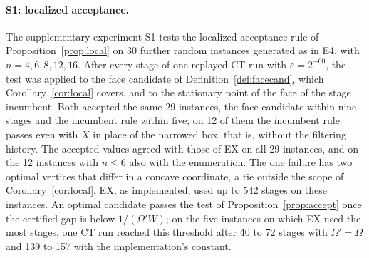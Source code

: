 \paragraph{S1: localized acceptance.}\label{sec:comp-localized}
The supplementary experiment S1 tests the localized acceptance rule of
Proposition~\ref{prop:local} on 30 further random instances generated as in
E4, with $n=4,6,8,12,16$. After every stage of one replayed CT run with
$\varepsilon=2^{-60}$, the test was applied to the face candidate of
Definition~\ref{def:facecand}, which Corollary~\ref{cor:local} covers, and to
the stationary point of the face of the stage incumbent. Both accepted the
same 29 instances, the face candidate within nine stages and the incumbent
rule within five; on 12 of them the incumbent rule passes even with $X$ in
place of the narrowed box, that is, without the filtering history. The
accepted values agreed with those of EX on all 29 instances, and on the 12
instances with $n\le6$ also with the enumeration. The one failure has two
optimal vertices that differ in a concave coordinate, a tie outside the scope
of Corollary~\ref{cor:local}. EX, as implemented, used up to 542 stages on
these instances. An optimal candidate passes the test of
Proposition~\ref{prop:accept} once the certified gap is below $1/(\Omega'W)$;
on the five instances on which EX used the most stages, one CT run reached
this threshold after 40 to 72 stages with $\Omega'=\Omega$ and 139 to 157
with the implementation's constant.

